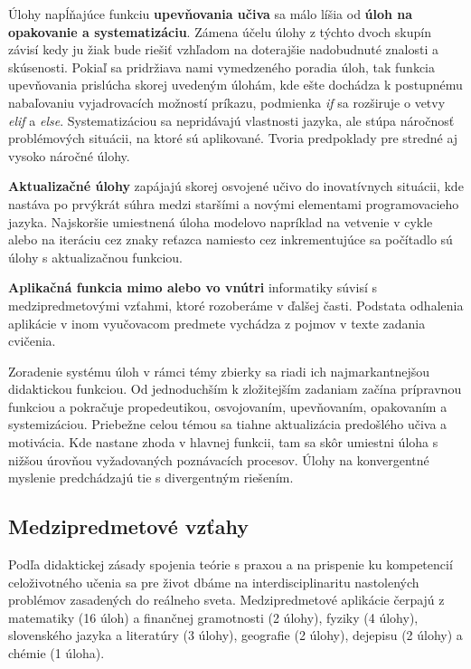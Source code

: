 Úlohy napĺňajúce funkciu \textbf{upevňovania učiva} sa málo líšia od \textbf{úloh na opakovanie a systematizáciu}. Zámena účelu úlohy z týchto dvoch skupín závisí kedy ju žiak bude riešiť vzhľadom na doterajšie nadobudnuté znalosti a skúsenosti. Pokiaľ sa pridržiava nami vymedzeného poradia úloh, tak funkcia upevňovania prislúcha skorej uvedeným úlohám, kde ešte dochádza k postupnému nabaľovaniu vyjadrovacích možností príkazu, podmienka \emph{if} sa rozširuje o vetvy \emph{elif} a \emph{else}. Systematizáciou sa nepridávajú vlastnosti jazyka, ale stúpa náročnosť problémových situácii, na ktoré sú aplikované. Tvoria predpoklady pre stredné aj vysoko náročné úlohy.

\textbf{Aktualizačné úlohy} zapájajú skorej osvojené učivo do inovatívnych situácii, kde nastáva po prvýkrát súhra medzi staršími a novými elementami programovacieho jazyka. Najskoršie umiestnená úloha modelovo napríklad na vetvenie v cykle alebo na iteráciu cez znaky reťazca namiesto cez inkrementujúce sa počítadlo sú úlohy s aktualizačnou funkciou.

\textbf{Aplikačná funkcia mimo alebo vo vnútri} informatiky súvisí s medzipredmetovými vzťahmi, ktoré rozoberáme v ďalšej časti. Podstata odhalenia aplikácie v inom vyučovacom predmete vychádza z pojmov v texte zadania cvičenia.

Zoradenie systému úloh v rámci témy zbierky sa riadi ich najmarkantnejšou didaktickou funkciou. Od jednoduchším k zložitejším zadaniam začína prípravnou funkciou a pokračuje propedeutikou, osvojovaním, upevňovaním, opakovaním a systemizáciou. Priebežne celou témou sa tiahne aktualizácia predošlého učiva a motivácia. Kde nastane zhoda v hlavnej funkcii, tam sa skôr umiestni úloha s nižšou úrovňou vyžadovaných poznávacích procesov. Úlohy na konvergentné myslenie predchádzajú tie s divergentným riešením.

\subsection{Medzipredmetové vzťahy}
Podľa didaktickej zásady spojenia teórie s praxou a na prispenie ku kompetencií celoživotného učenia sa pre život dbáme na interdisciplinaritu nastolených problémov zasadených do reálneho sveta. Medzipredmetové aplikácie čerpajú z matematiky (16 úloh) a finančnej gramotnosti (2 úlohy), fyziky (4 úlohy), slovenského jazyka a literatúry (3 úlohy), geografie (2 úlohy), dejepisu (2 úlohy) a chémie (1 úloha).

